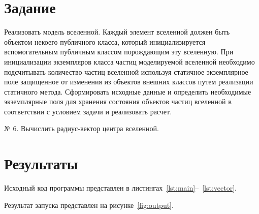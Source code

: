 \documentclass[a4paper, 14pt]{extarticle}
\begin{document}
\renewcommand{\ttdefault}{pcr}

\setlength{\tabcolsep}{3pt}
\newpage
\setcounter{page}{2}

\section{Задание}\label{Sect::task}

Реализовать модель вселенной. Каждый элемент вселенной должен быть объектом
некоего публичного класса, который инициализируется вспомогательным публичным
классом порождающим эту вселенную. При инициализации экземпляров класса частиц
моделируемой вселенной необходимо подсчитывать количество частиц вселенной используя
статичное экземплярное поле защищенное от изменения из объектов внешних классов путем
реализации статичного метода. Сформировать исходные данные и определить необходимые
экземплярные поля для хранения состояния объектов частиц вселенной в соответствии с
условием задачи и реализовать расчет.

№ 6. Вычислить радиус-вектор центра вселенной.

\section{Результаты}\label{Sect::res}

Исходный код программы представлен в листингах~\ref{lst:main}--~\ref{lst:vector}.

Результат запуска представлен на рисунке~\ref{fig:output}.

\newpage
\end{document}

